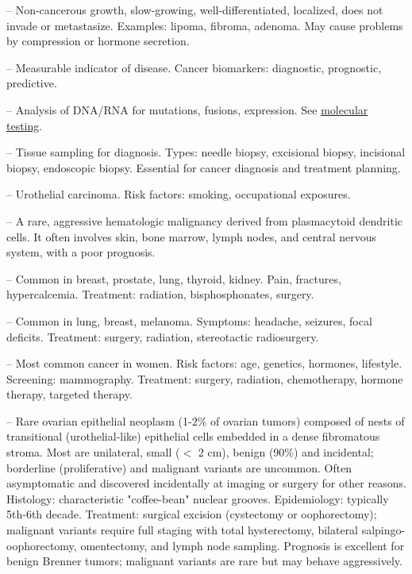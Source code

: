 -- Non-cancerous growth, slow-growing, well-differentiated, localized, does not invade or metastasize. Examples: lipoma, fibroma, adenoma. May cause problems by compression or hormone secretion.

-- Measurable indicator of disease. Cancer biomarkers: diagnostic, prognostic, predictive.

-- Analysis of DNA/RNA for mutations, fusions, expression. See \hyperlink{Molecular Testing}{molecular testing}.

-- Tissue sampling for diagnosis. Types: needle biopsy, excisional biopsy, incisional biopsy, endoscopic biopsy. Essential for cancer diagnosis and treatment planning.

-- Urothelial carcinoma. Risk factors: smoking, occupational exposures.

-- A rare, aggressive hematologic malignancy derived from plasmacytoid dendritic cells. It often involves skin, bone marrow, lymph nodes, and central nervous system, with a poor prognosis.

-- Common in breast, prostate, lung, thyroid, kidney. Pain, fractures, hypercalcemia. Treatment: radiation, bisphosphonates, surgery.

-- Common in lung, breast, melanoma. Symptoms: headache, seizures, focal deficits. Treatment: surgery, radiation, stereotactic radiosurgery.

-- Most common cancer in women. Risk factors: age, genetics, hormones, lifestyle. Screening: mammography. Treatment: surgery, radiation, chemotherapy, hormone therapy, targeted therapy.

-- Rare ovarian epithelial neoplasm (1-2\% of ovarian tumors) composed of nests of transitional (urothelial-like) epithelial cells embedded in a dense fibromatous stroma. Most are unilateral, small ($<$ 2 cm), benign (90\%) and incidental; borderline (proliferative) and malignant variants are uncommon. Often asymptomatic and discovered incidentally at imaging or surgery for other reasons. Histology: characteristic "coffee-bean" nuclear grooves. Epidemiology: typically 5th-6th decade. Treatment: surgical excision (cystectomy or oophorectomy); malignant variants require full staging with total hysterectomy, bilateral salpingo-oophorectomy, omentectomy, and lymph node sampling. Prognosis is excellent for benign Brenner tumors; malignant variants are rare but may behave aggressively.

